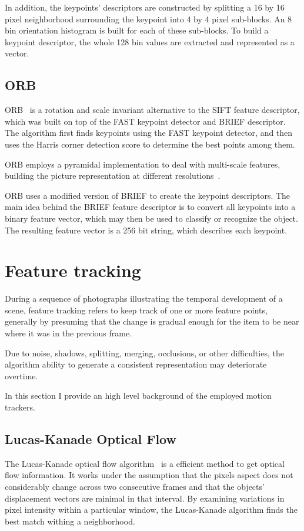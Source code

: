 \documentclass[journal]{IEEEtran}
\begin{document}
In addition, the keypoints' descriptors are constructed by splitting a 16 by 16 pixel neighborhood surrounding the keypoint into 4 by 4 pixel sub-blocks. An 8 bin orientation histogram is built for each of these sub-blocks. To build a keypoint descriptor, the whole 128 bin values are extracted and represented as a vector.

\subsection{ORB}
ORB~\cite{rublee2011orb} is a rotation and scale invariant alternative to the SIFT feature descriptor, which was built on top of the FAST keypoint detector and BRIEF descriptor.
The algorithm first finds keypoints using the FAST keypoint detector, and then uses the Harris corner detection score to determine the best points among them.

ORB employs a pyramidal implementation to deal with multi-scale features, building the picture representation at different resolutions~\cite{opencv_library}.

ORB uses a modified version of BRIEF to create the keypoint descriptors. The main idea behind the BRIEF feature descriptor is to convert all keypoints into a binary feature vector, which may then be used to classify or recognize the object. The resulting feature vector is a 256 bit string, which describes each keypoint.

\section{Feature tracking}
\label{sec:featuretracking}
During a sequence of photographs illustrating the temporal development of a scene, feature tracking refers to keep track of one or more feature points, generally by presuming that the change is gradual enough for the item to be near where it was in the previous frame.

Due to noise, shadows, splitting, merging, occlusions, or other difficulties, the algorithm ability to generate a consistent representation may deteriorate overtime.

In this section I provide an high level background of the employed motion trackers.

\subsection{Lucas-Kanade Optical Flow}

The Lucas-Kanade optical flow algorithm~\cite{lucas1981iterative} is a efficient method to get optical flow information. It works under the assumption that the pixels aspect does not considerably change across two consecutive frames and that the objects' displacement vectors are minimal in that interval. By examining variations in pixel intensity within a particular window, the Lucas-Kanade algorithm finds the best match withing a neighborhood.
\end{document}
